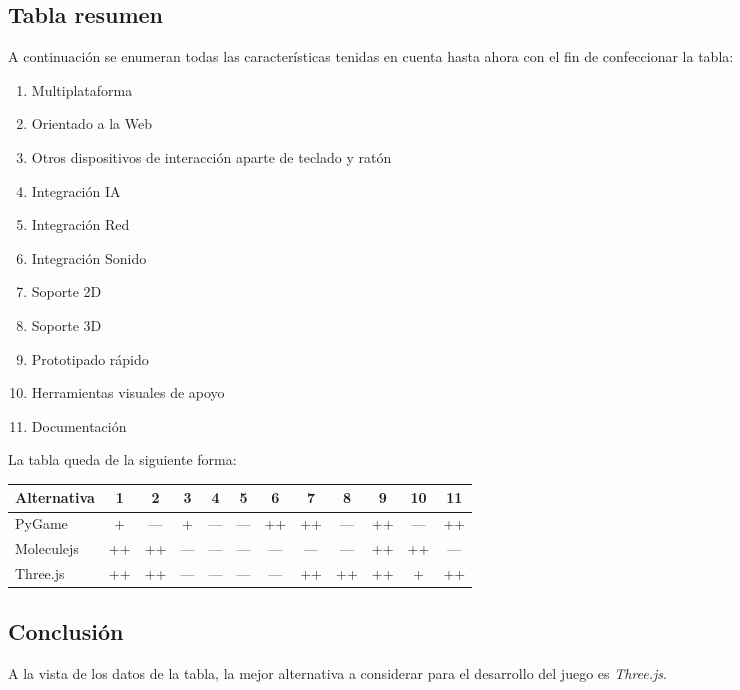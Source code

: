 \documentclass[a4paper]{article}
\begin{document}
\subsection{Tabla resumen}
A continuación se enumeran todas las características tenidas en cuenta hasta ahora con el fin de confeccionar la tabla:
\begin{enumerate}
\item Multiplataforma
\item Orientado a la Web
\item Otros dispositivos de interacción aparte de teclado y ratón
\item Integración IA
\item Integración Red
\item Integración Sonido
\item Soporte 2D
\item Soporte 3D
\item Prototipado rápido
\item Herramientas visuales de apoyo
\item Documentación
\end{enumerate}

La tabla queda de la siguiente forma:
\begin{center}
\begin{tabular}{ |l| *{11}{c|} }
\hline
Alternativa  & 1 & 2 & 3 & 4 & 5 & 6 & 7 & 8 & 9 & 10 & 11 \\ \hline \hline
PyGame & +& ---& +& ---& ---& ++& ++& ---& ++& ---& ++\\
Moleculejs & ++& ++& ---& ---& ---& ---& ---& ---& ++& ++& ---\\
Three.js & ++& ++& ---& ---& ---& ---& ++& ++& ++& +& ++\\
\hline
\end{tabular}
\end{center}

\subsection{Conclusión}
A la vista de los datos de la tabla, la mejor alternativa a considerar para el desarrollo del juego es \emph{Three.js}.
\end{document}
